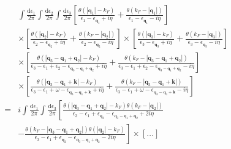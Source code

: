 \[ \begin{split} &\int \frac{\mathrm{d}\epsilon_1}{2\pi} \int \frac{\mathrm{d}\epsilon_2}{2\pi} \int \frac{\mathrm{d}\epsilon_3}{2\pi}\left[ \frac{\theta(|\mathbf{q}_1|-k_F)}{\epsilon_1-\epsilon_{\mathbf{q}_1}+i \eta} + \frac{\theta(k_F-|\mathbf{q}_1|)}{\epsilon_1-\epsilon_{\mathbf{q}_1}-i \eta} \right] \\
& \times \left[ \frac{\theta(|\mathbf{q}_2|-k_F)}{\epsilon_2-\epsilon_{\mathbf{q}_2}+i \eta} + \frac{\theta(k_F-|\mathbf{q}_2|)}{\epsilon_2-\epsilon_{\mathbf{q}_2}-i \eta} \right] \times \left[ \frac{\theta(|\mathbf{q}_3|-k_F)}{\epsilon_3-\epsilon_{\mathbf{q}_3}+i \eta} + \frac{\theta(k_F-|\mathbf{q}_3|)}{\epsilon_3-\epsilon_{\mathbf{q}_3}-i \eta} \right] \\
& \times \left[ \frac{\theta(|\mathbf{q}_3-\mathbf{q}_1+\mathbf{q}_2|-k_F)}{\epsilon_3-\epsilon_1+\epsilon_2-\epsilon_{\mathbf{q}_3-\mathbf{q}_1+\mathbf{q}_2}+i \eta} + \frac{\theta(k_F-|\mathbf{q}_3-\mathbf{q}_1+\mathbf{q}_2|)}{\epsilon_3-\epsilon_1+\epsilon_2-\epsilon_{\mathbf{q}_3-\mathbf{q}_1+\mathbf{q}_2}-i \eta} \right]\\
& \times \left[ \frac{\theta(|\mathbf{q}_3-\mathbf{q}_1+\mathbf{k}|-k_F)}{\epsilon_3-\epsilon_1+\omega-\epsilon_{\mathbf{q}_3-\mathbf{q}_1+\mathbf{k}}+i \eta} + \frac{\theta(k_F-|\mathbf{q}_3-\mathbf{q}_1+\mathbf{k}|)}{\epsilon_3-\epsilon_1+\omega-\epsilon_{\mathbf{q}_3-\mathbf{q}_1+\mathbf{k}}-i \eta} \right]\\
=& i \int \frac{\mathrm{d}\epsilon_1}{2\pi} \int \frac{\mathrm{d}\epsilon_3}{2\pi} \left[ \frac{\theta(|\mathbf{q}_3-\mathbf{q}_1+\mathbf{q}_2|-k_F)\theta(k_F-|\mathbf{q}_2|)}{\epsilon_3-\epsilon_1+\epsilon_{\mathbf{q}_2}-\epsilon_{\mathbf{q}_3-\mathbf{q}_1+\mathbf{q}_2}+2i \eta} \right. \\
& \left. - \frac{\theta(k_F-|\mathbf{q}_3-\mathbf{q}_1+\mathbf{q}_2|)\theta(|\mathbf{q}_2|-k_F)}{\epsilon_3-\epsilon_1+\epsilon_{\mathbf{q}_2}-\epsilon_{\mathbf{q}_3-\mathbf{q}_1+\mathbf{q}_2}-2i \eta} \right] \times \left[ \ldots \right]
\end{split} \]
